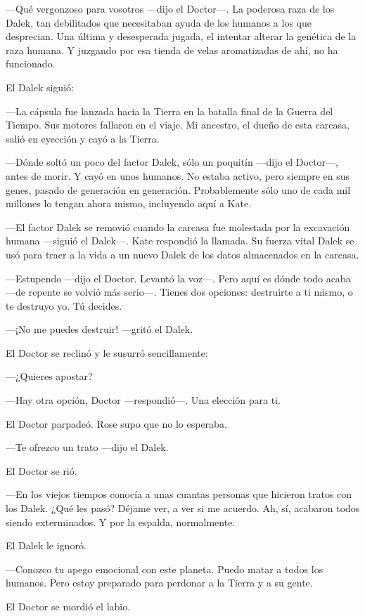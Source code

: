 ---Qué vergonzoso para vosotros ---dijo el Doctor---. La poderosa raza de
los Dalek, tan debilitados que necesitaban ayuda de los humanos a los
que desprecian. Una última y desesperada jugada, el intentar alterar la
genética de la raza humana. Y juzgando por esa tienda de velas
aromatizadas de ahí, no ha funcionado.

El Dalek siguió:

---La cápsula fue lanzada hacia la Tierra en la batalla final de la
Guerra del Tiempo. Sus motores fallaron en el viaje. Mi ancestro, el
dueño de esta carcasa, salió en eyección y cayó a la Tierra.

---Dónde soltó un poco del factor Dalek, sólo un poquitín ---dijo el
Doctor---, antes de morir. Y cayó en unos humanos. No estaba activo, pero
siempre en sus genes, pasado de generación en generación. Probablemente
sólo uno de cada mil millones lo tengan ahora mismo, incluyendo aquí a
Kate.

---El factor Dalek se removió cuando la carcasa fue molestada por la
excavación humana ---siguió el Dalek---. Kate respondió la llamada. Su
fuerza vital Dalek se usó para traer a la vida a un nuevo Dalek de los
datos almacenados en la carcasa.

---Estupendo ---dijo el Doctor. Levantó la voz---. Pero aquí es dónde todo
acaba ---de repente se volvió más serio---. Tienes dos opciones:
destruirte a ti mismo, o te destruyo yo. Tú decides.

---¡No me puedes destruir! ---gritó el Dalek.

El Doctor se reclinó y le susurró sencillamente:

---¿Quieres apostar?

---Hay otra opción, Doctor ---respondió---. Una elección para ti.

El Doctor parpadeó. Rose supo que no lo esperaba.

---Te ofrezco un trato ---dijo el Dalek.

El Doctor se rió.

---En los viejos tiempos conocía a unas cuantas personas que hicieron
tratos con los Dalek. ¿Qué les pasó? Déjame ver, a ver si me acuerdo.
Ah, sí, acabaron todos siendo exterminados. Y por la espalda,
normalmente.

El Dalek le ignoró.

---Conozco tu apego emocional con este planeta. Puedo matar a todos los
humanos. Pero estoy preparado para perdonar a la Tierra y a su gente.

El Doctor se mordió el labio.

